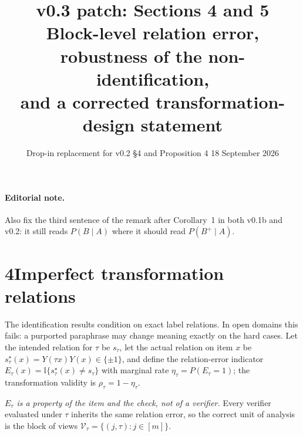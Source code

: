 \documentclass[11pt]{article}
\title{\textbf{v0.3 patch: Sections 4 and 5}\\[2pt]
\large Block-level relation error, robustness of the non-identification,\\ and a corrected transformation-design statement}
\author{Drop-in replacement for v0.2 \S4 and Proposition 4 \textperiodcentered{} 18 September 2026}
\date{}
\theoremstyle{remark}
\newcommand{\cV}{\mathcal{V}}
\begin{document}
\maketitle
\vspace{-2.5em}

\paragraph{Editorial note.} Also fix the third sentence of the remark after Corollary~1 in both v0.1b and v0.2: it still reads $P(B\mid A)$ where it should read $P(B^+\mid A)$.

\section*{4\quad Imperfect transformation relations}

The identification results condition on exact label relations. In open domains this fails: a purported paraphrase may change meaning exactly on the hard cases. Let the intended relation for $\tau$ be $s_\tau$, let the actual relation on item $x$ be $s^\star_\tau(x)=Y(\tau x)Y(x)\in\{\pm1\}$, and define the relation-error indicator $E_\tau(x)=\mathbb{I}\{s^\star_\tau(x)\neq s_\tau\}$ with marginal rate $\eta_\tau=P(E_\tau=1)$; the transformation validity is $\rho_\tau=1-\eta_\tau$.

\emph{$E_\tau$ is a property of the item and the check, not of a verifier.} Every verifier evaluated under $\tau$ inherits the same relation error, so the correct unit of analysis is the block of views $\cV_\tau=\{(j,\tau):j\in[m]\}$.
\end{document}
